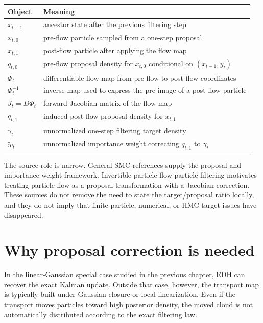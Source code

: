 \begin{center}
\small
\begin{tabular}{p{} p{}}
\toprule
Object & Meaning \\
\midrule
$x_{t-1}$ & ancestor state after the previous filtering step \\
$x_{t,0}$ & pre-flow particle sampled from a one-step proposal \\
$x_{t,1}$ & post-flow particle after applying the flow map \\
$q_{t,0}$ & pre-flow proposal density for $x_{t,0}$ conditional on
$(x_{t-1},y_t)$ \\
$\Phi_t$ & differentiable flow map from pre-flow to post-flow coordinates \\
$\Phi_t^{-1}$ & inverse map used to express the pre-image of a post-flow
particle \\
$J_t=D\Phi_t$ & forward Jacobian matrix of the flow map \\
$q_{t,1}$ & induced post-flow proposal density for $x_{t,1}$ \\
$\gamma_t$ & unnormalized one-step filtering target density \\
$\tilde w_t$ & unnormalized importance weight correcting $q_{t,1}$ to
$\gamma_t$ \\
\bottomrule
\end{tabular}
\end{center}

The source role is narrow.  General SMC references
\citep{doucet2001sequential,chopin2020introduction} supply the proposal and
importance-weight framework.  Invertible particle-flow particle filtering
\citep{li2017particle} motivates treating particle flow as a proposal
transformation with a Jacobian correction.  These sources do not remove the
need to state the target/proposal ratio locally, and they do not imply that
finite-particle, numerical, or HMC target issues have disappeared.

\section{Why proposal correction is needed}
\label{sec:bf-pfpf-why-correction}

In the linear-Gaussian special case studied in the previous chapter, EDH can
recover the exact Kalman update.  Outside that case, however, the transport map
is typically built under Gaussian closure or local linearization.  Even if the
transport moves particles toward high posterior density, the moved cloud is not
automatically distributed according to the exact filtering law.


